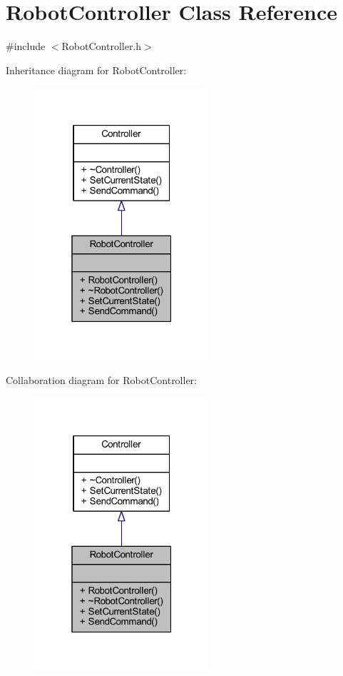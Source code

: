 \hypertarget{class_robot_controller}{}\section{Robot\+Controller Class Reference}
\label{class_robot_controller}


{\ttfamily \#include $<$Robot\+Controller.\+h$>$}



Inheritance diagram for Robot\+Controller\+:
\nopagebreak
\begin{figure}[H]
\begin{center}
\leavevmode
\includegraphics[width=184pt]{class_robot_controller__inherit__graph}
\end{center}
\end{figure}


Collaboration diagram for Robot\+Controller\+:
\nopagebreak
\begin{figure}[H]
\begin{center}
\leavevmode
\includegraphics[width=184pt]{class_robot_controller__coll__graph}
\end{center}
\end{figure}
